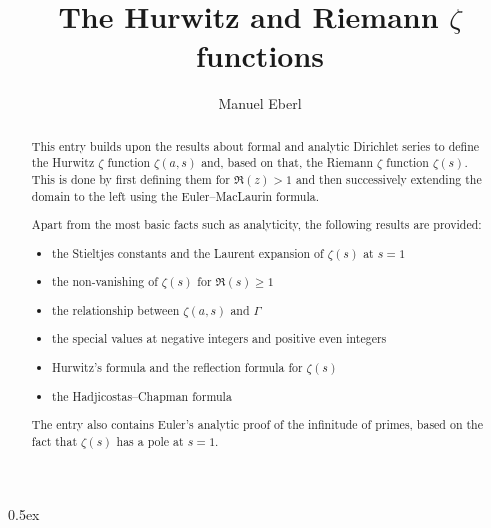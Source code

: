 \documentclass[11pt,a4paper]{article}
\begin{document}
\title{The Hurwitz and Riemann $\zeta$ functions}
\author{Manuel Eberl}
\maketitle

\begin{abstract}
This entry builds upon the results about formal and analytic Dirichlet series to define the Hurwitz $\zeta$ function $\zeta(a,s)$ and,
based on that, the Riemann $\zeta$ function $\zeta(s)$. This is done by first defining them for $\mathfrak{R}(z) > 1$ and then successively
extending the domain to the left using the Euler--MacLaurin formula.

Apart from the most basic facts such as analyticity, the following results are provided:
\begin{itemize}
\item the Stieltjes constants and the Laurent expansion of $\zeta(s)$ at $s = 1$
\item the non-vanishing of $\zeta(s)$ for $\mathfrak{R}(s)\geq 1$
\item the relationship between $\zeta(a,s)$ and $\Gamma$
\item the special values at negative integers and positive even integers
\item Hurwitz's formula and the reflection formula for $\zeta(s)$
\item the Hadjicostas--Chapman formula~\cite{chapman2004,hadjicostas2004}
\end{itemize}

The entry also contains Euler's analytic proof of the infinitude of primes, based on the fact that $\zeta(s)$ has a pole at $s = 1$.
\end{abstract}

\newpage
\tableofcontents
\newpage
\parindent 0pt\parskip 0.5ex





\end{document}
